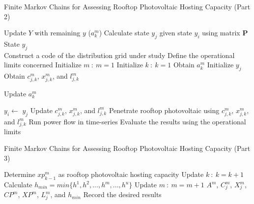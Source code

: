 \begin{algorithm}[!t]
	\caption{Finite Markov Chains for Assessing Rooftop Photovoltaic Hosting Capacity (Part 2)}
	\begin{algorithmic}[1]
		\State Update $Y$ with remaining $y$
		\EndIf
		\State{}($a^m_k$)
		\State Calculate state $y_j$ given state $y_i$ using matrix $\mathbf{P}$
		\EndFor
		\State\Return State $y_j$
		\EndFunction\\
		
		\State{}
		\State{}
		\State Construct a code of the distribution grid under study
		\State Define the operational limits concerned
		\State Initialize  $m\ :\ m=1$
		\State Initialize  $k\ :\ k=1$
		\State Obtain $a^m_k$
		\State{}
		\State Initialize $y_j$
		\State Obtain $c^m_{j,k}$, $x^m_{j,k}$, and $l^m_{j,k}$
		\State{}
		\State{}
		
		\State{}
		\State{}
		\State Update $a^m_k$
		\EndIf	

		\State $y_i \gets$ $y_j$
		\State{}
		\State Update $c^m_{j,k}$, $x^m_{j,k}$, and $l^m_{j,k}$ 
		\EndIf		
		\State Penetrate rooftop photovoltaic using $c^m_{j,k}$, $x^m_{j,k}$, and $l^m_{j,k}$
		\State Run power flow in time-series
		\State Evaluate the results using the operational limits		
\end{algorithmic}
\end{algorithm}	
\addtocounter{algorithm}{-1}
\begin{algorithm}[!t]
\caption{Finite Markov Chains for Assessing Rooftop Photovoltaic Hosting Capacity (Part 3)}
\begin{algorithmic}[1]
		\State Determine $\mathit{xp^m_{k-\text{1}}}$ as rooftop photovoltaic hosting capacity
		\EndIf		
		\State Update $k\ :\ k=k+1$
		\EndWhile
		\State Calculate $\mathit{h_{min}}=min\{h^1,h^2,...,h^m,...,h^u\}$
		\State Update $m\ :\ m=m+1$
		\EndWhile		
		\State\Return $\mathit{A^m}$, $\mathit{C^m_j}$, $\mathit{X^m_j}$, $\mathit{CP^m}$, $\mathit{XP^m}$, $\mathit{L^m_j}$, and $\mathit{h_{min}}$
		\State Record the desired results
		\EndFunction
	\end{algorithmic}
\end{algorithm}
